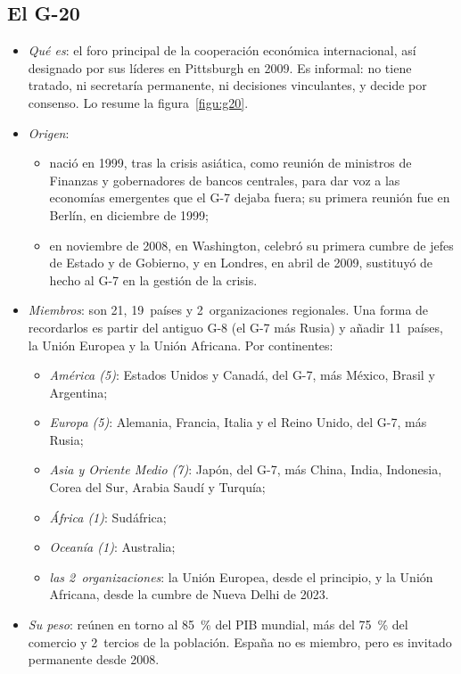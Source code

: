 \documentclass[11pt]{article}
\begin{document}
\subsection{El G-20}\label{sec:g20}

\begin{itemize}
\item \emph{Qué es}: el foro principal de la cooperación económica internacional, así designado por sus líderes en Pittsburgh en 2009\nocite{G20Pittsburgh2009}. Es informal: no tiene tratado, ni secretaría permanente, ni decisiones vinculantes, y decide por consenso. Lo resume la figura~\ref{figu:g20}.
\item \emph{Origen}:
  \begin{itemize}
  \item nació en 1999, tras la crisis asiática, como reunión de ministros de Finanzas y gobernadores de bancos centrales, para dar voz a las economías emergentes que el G-7 dejaba fuera; su primera reunión fue en Berlín, en diciembre de 1999\nocite{G201999Berlin};
  \item en noviembre de 2008, en Washington, celebró su primera cumbre de jefes de Estado y de Gobierno, y en Londres, en abril de 2009, sustituyó de hecho al G-7 en la gestión de la crisis\nocite{Frankel2016Coordination}.
  \end{itemize}
\item \emph{Miembros}: son 21, 19~países y 2~organizaciones regionales. Una forma de recordarlos es partir del antiguo G-8 (el G-7 más Rusia) y añadir 11~países, la Unión Europea y la Unión Africana. Por continentes\nocite{G20Acerca,G20NuevaDelhi2023}:
  \begin{itemize}
  \item \emph{América (5)}: Estados Unidos y Canadá, del G-7, más México, Brasil y Argentina;
  \item \emph{Europa (5)}: Alemania, Francia, Italia y el Reino Unido, del G-7, más Rusia;
  \item \emph{Asia y Oriente Medio (7)}: Japón, del G-7, más China, India, Indonesia, Corea del Sur, Arabia Saudí y Turquía;
  \item \emph{África (1)}: Sudáfrica;
  \item \emph{Oceanía (1)}: Australia;
  \item \emph{las 2~organizaciones}: la Unión Europea, desde el principio, y la Unión Africana, desde la cumbre de Nueva Delhi de 2023\nocite{G20NuevaDelhi2023}.
  \end{itemize}
\item \emph{Su peso}: reúnen en torno al 85~\% del PIB mundial, más del 75~\% del comercio y 2~tercios de la población\nocite{G20Acerca}. España no es miembro, pero es invitado permanente desde 2008.
\end{itemize}
\end{document}
